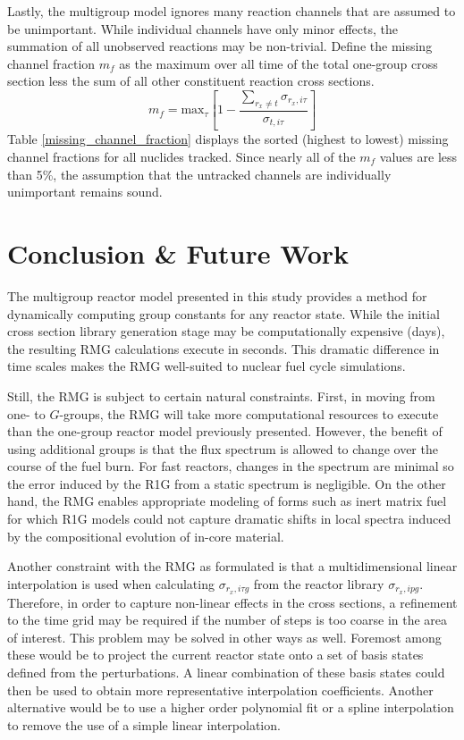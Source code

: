 Lastly, the multigroup model ignores many reaction channels that are assumed to be 
unimportant.  While individual channels have only minor effects, the summation of all 
unobserved reactions may be non-trivial.  Define the missing channel fraction $m_f$ as the maximum 
over all time of the total one-group cross section less the sum of all other constituent reaction 
cross sections.
\begin{equation}
\label{mcf}
m_f = \mbox{max}_{\tau}\left[1 - \frac{\sum_{r_x \ne t}\sigma_{r_x,i\tau}}{\sigma_{t,i\tau}}\right]
\end{equation}
Table \ref{missing_channel_fraction} displays the sorted (highest to lowest) missing 
channel fractions for all nuclides tracked.  Since nearly all of the $m_f$ values are
less than 5\%, the assumption that the untracked channels are individually unimportant
remains sound.




\section{Conclusion \& Future Work}
\label{mg_sec:conc}
The multigroup reactor model presented in this study provides a method for dynamically
computing group constants for any reactor state.  While the initial cross section library
generation stage may be computationally expensive (days), the resulting RMG calculations 
execute in seconds.  This dramatic difference in time scales
makes the RMG well-suited to nuclear fuel cycle simulations.

Still, the RMG is subject to certain natural constraints.  First, in moving from one- to $G$-groups,
the RMG will take more computational resources to execute than the one-group
reactor model previously presented.  However, the benefit of using additional groups is that the flux
spectrum is allowed to change over the course of the fuel burn.  For fast reactors,
changes in the spectrum are minimal so the error induced by the R1G from a static spectrum
is negligible.  On the other hand, the RMG enables appropriate modeling of forms such as inert matrix 
fuel \cite{Sokolov2006} for which R1G models could not capture dramatic shifts in local spectra induced 
by the compositional evolution of in-core material.

Another constraint with the RMG as formulated is that a multidimensional linear interpolation is 
used when calculating $\sigma_{r_x,i\tau g}$ from the reactor library $\sigma_{r_x,ipg}$.  Therefore, 
in order to capture non-linear effects in the cross sections, a refinement to the time grid may 
be required if the number of steps is too coarse in the area of interest.  This problem may be solved
in other ways as well.  Foremost among these would be to project the current reactor state onto a 
set of basis states defined from the perturbations.  A linear combination of these basis states could then
be used to obtain more representative interpolation coefficients.  Another alternative would be to use a 
higher order polynomial fit or a spline interpolation to remove the use of a simple linear interpolation. 


